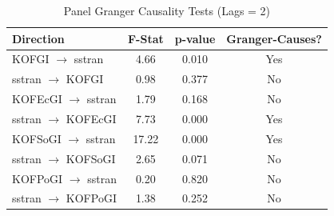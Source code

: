 \begin{table}
\caption{Panel Granger Causality Tests (Lags = 2)}
\label{tab:granger}
\begin{tabular}{lccc}
\toprule
Direction & F-Stat & p-value & Granger-Causes? \\
\midrule
KOFGI $\rightarrow$ sstran & 4.66 & 0.010 & Yes \\
sstran $\rightarrow$ KOFGI & 0.98 & 0.377 & No \\
KOFEcGI $\rightarrow$ sstran & 1.79 & 0.168 & No \\
sstran $\rightarrow$ KOFEcGI & 7.73 & 0.000 & Yes \\
KOFSoGI $\rightarrow$ sstran & 17.22 & 0.000 & Yes \\
sstran $\rightarrow$ KOFSoGI & 2.65 & 0.071 & No \\
KOFPoGI $\rightarrow$ sstran & 0.20 & 0.820 & No \\
sstran $\rightarrow$ KOFPoGI & 1.38 & 0.252 & No \\
\bottomrule
\end{tabular}
\end{table}
